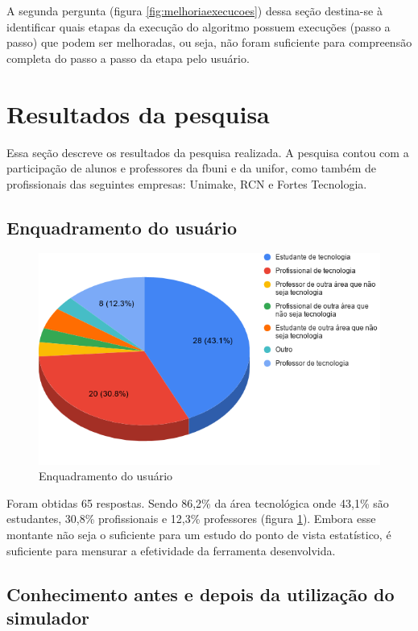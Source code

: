 A segunda pergunta (figura \ref{fig:melhoriaexecucoes}) dessa seção destina-se à identificar quais etapas da execução do algoritmo possuem execuções (passo a passo) que podem ser melhoradas, ou seja, não foram suficiente para compreensão completa do passo a passo da etapa pelo usuário.

\section{Resultados da pesquisa}

Essa seção descreve os resultados da pesquisa realizada. A pesquisa contou com a participação de alunos e professores da \acrshort{fbuni} e da \acrshort{unifor}, como também de profissionais das seguintes empresas: Unimake, RCN e Fortes Tecnologia.

\subsection{Enquadramento do usuário}

\begin{figure}[H]
    \centering
    \caption{Enquadramento do usuário}
    \label{fig:enquadramentousuarioresp}
    \includegraphics[width=.65\linewidth]{Questionario/CQ1.png}
\end{figure}

Foram obtidas 65 respostas. Sendo 86,2\% da área tecnológica onde 43,1\% são estudantes, 30,8\% profissionais e 12,3\% professores (figura \ref{fig:enquadramentousuarioresp}). Embora esse montante não seja o suficiente para um estudo do ponto de vista estatístico, é suficiente para mensurar a efetividade da ferramenta desenvolvida.

\subsection{Conhecimento antes e depois da utilização do simulador}

